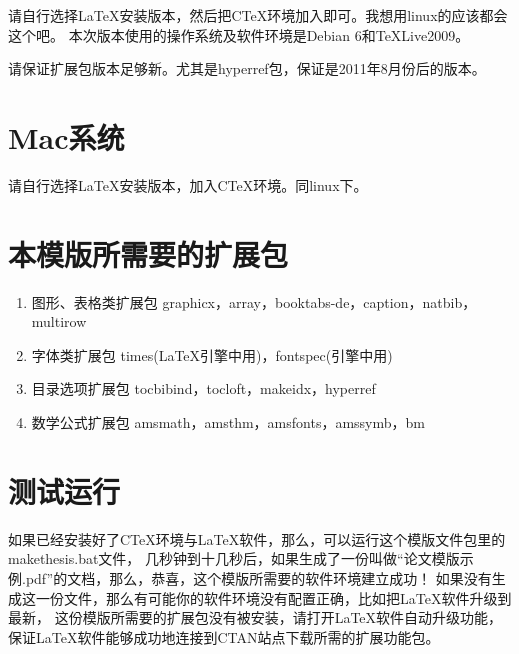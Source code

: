 请自行选择\LaTeX 安装版本，然后把CTeX环境加入即可。我想用linux的应该都会这个吧。
本次版本使用的操作系统及软件环境是Debian 6和TeXLive2009。

请保证扩展包版本足够新。尤其是hyperref包，保证是2011年8月份后的版本。

\section{Mac系统}

请自行选择\LaTeX 安装版本，加入CTeX环境。同linux下。

\section{本模版所需要的扩展包}

\begin{enumerate}

\item{图形、表格类扩展包} graphicx，array，booktabs-de，caption，natbib，multirow

\item{字体类扩展包} times(\LaTeX{}引擎中用)，fontspec(\XeTeX{}引擎中用)

\item{目录选项扩展包} tocbibind，tocloft，makeidx，hyperref

\item{数学公式扩展包} amsmath，amsthm，amsfonts，amssymb，bm

\end{enumerate}

\section{测试运行}

如果已经安装好了CTeX环境与\LaTeX 软件，那么，可以运行这个模版文件包里的makethesis.bat文件，
几秒钟到十几秒后，如果生成了一份叫做“论文模版示例.pdf”的文档，那么，恭喜，这个模版所需要的软件环境建立成功！
如果没有生成这一份文件，那么有可能你的软件环境没有配置正确，比如把\LaTeX 软件升级到最新，
这份模版所需要的扩展包没有被安装，请打开\LaTeX 软件自动升级功能，
保证\LaTeX 软件能够成功地连接到CTAN站点下载所需的扩展功能包。

